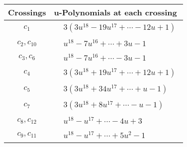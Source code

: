 \documentclass[1p]{elsarticle_modified}
\theoremstyle{definition}
\begin{document}
\begin{tabular}{m{50pt}|m{274pt}}
Crossings & \hspace{64pt}u-Polynomials at each crossing \\
\hline $$\begin{aligned}c_{1}\end{aligned}$$&$\begin{aligned}
&3(3 u^{18}-19 u^{17}+\cdots-12 u+1)
\end{aligned}$\\
\hline $$\begin{aligned}c_{2},c_{10}\end{aligned}$$&$\begin{aligned}
&u^{18}-7 u^{16}+\cdots+3 u-1
\end{aligned}$\\
\hline $$\begin{aligned}c_{3},c_{6}\end{aligned}$$&$\begin{aligned}
&u^{18}-7 u^{16}+\cdots-3 u-1
\end{aligned}$\\
\hline $$\begin{aligned}c_{4}\end{aligned}$$&$\begin{aligned}
&3(3 u^{18}+19 u^{17}+\cdots+12 u+1)
\end{aligned}$\\
\hline $$\begin{aligned}c_{5}\end{aligned}$$&$\begin{aligned}
&3(3 u^{18}+34 u^{17}+\cdots+u-1)
\end{aligned}$\\
\hline $$\begin{aligned}c_{7}\end{aligned}$$&$\begin{aligned}
&3(3 u^{18}+8 u^{17}+\cdots- u-1)
\end{aligned}$\\
\hline $$\begin{aligned}c_{8},c_{12}\end{aligned}$$&$\begin{aligned}
&u^{18}- u^{17}+\cdots-4 u+3
\end{aligned}$\\
\hline $$\begin{aligned}c_{9},c_{11}\end{aligned}$$&$\begin{aligned}
&u^{18}- u^{17}+\cdots+5 u^2-1
\end{aligned}$\\
\hline
\end{tabular}\\~\\
\end{document}
